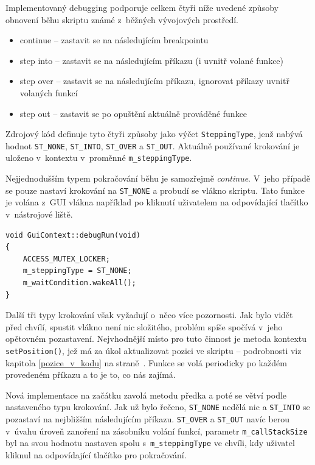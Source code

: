 \documentclass[11pt,twoside,a4paper]{book}
\begin{document}
Implementovaný debugging podporuje celkem čtyři níže uvedené způsoby obnovení běhu skriptu známé z~běžných vývojových prostředí.

\begin{itemize}
\item continue -- zastavit se na následujícím breakpointu
\item step into -- zastavit se na následujícím příkazu (i uvnitř volané funkce)
\item step over -- zastavit se na následujícím příkazu, ignorovat příkazy uvnitř volaných funkcí
\item step out -- zastavit se po opuštění aktuálně prováděné funkce
\end{itemize}

Zdrojový kód definuje tyto čtyři způsoby jako výčet \texttt{SteppingType}, jenž nabývá hodnot \texttt{ST\_NONE}, \texttt{ST\_INTO}, \texttt{ST\_OVER} a \texttt{ST\_OUT}. Aktuálně používané krokování je uloženo v~kontextu v~proměnné \texttt{m\_step\-ping\-Type}.

Nejjednodušším typem pokračování běhu je samozřejmě \textit{continue}. V~jeho případě se pouze nastaví krokování na \texttt{ST\_NONE} a probudí se vlákno skriptu. Tato funkce je volána z~GUI vlákna například po kliknutí uživatelem na odpovídající tlačítko v~nástrojové liště.

\begin{verbatim}
void GuiContext::debugRun(void)
{
    ACCESS_MUTEX_LOCKER;
    m_steppingType = ST_NONE;
    m_waitCondition.wakeAll();
}
\end{verbatim}

Další tři typy krokování však vyžadují o~něco více pozornosti. Jak bylo vidět před chvílí, spustit vlákno není nic složitého, problém spíše spočívá v~jeho opětovném pozastavení. Nejvhodnější místo pro tuto činnost je metoda kontextu \texttt{setPosition()}, jež má za úkol aktualizovat pozici ve skriptu -- podrobnosti viz kapitola \ref{pozice_v_kodu} na straně~\pageref{pozice_v_kodu}. Funkce se volá periodicky po každém provedeném příkazu a to je to, co nás zajímá.

Nová implementace na začátku zavolá metodu předka a poté se větví podle nastaveného typu krokování. Jak už bylo řečeno, \texttt{ST\_NONE} nedělá nic a \texttt{ST\_INTO} se pozastaví na nejbližším následujícím příkazu. \texttt{ST\_OVER} a \texttt{ST\_OUT} navíc berou v~úvahu úroveň zanoření na zásobníku volání funkcí, parametr \texttt{m\_callStackSize} byl na svou hodnotu nastaven spolu s~\texttt{m\_steppingType} ve chvíli, kdy uživatel kliknul na odpovídající tlačítko pro pokračování.
\end{document}
